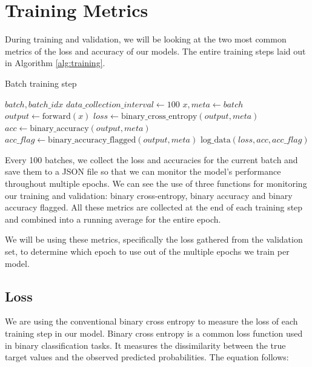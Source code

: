 \section{Training Metrics}

During training and validation, we will be looking at the two most common metrics of the loss and accuracy of our models. The entire training steps laid out in Algorithm \ref{alg:training}.

\begin{algorithm}[H]
    \caption{Batch training step}
    \begin{algorithmic}[1]
        \Require $batch, batch\_idx$
        \State $data\_collection\_interval \gets 100$
        \State $x, meta \gets batch$
        \State $output \gets \text{forward}(x)$
        \State $loss \gets \text{binary\_cross\_entropy}(output, meta)$
        \State $acc \gets \text{binary\_accuracy}(output, meta)$
        \State $acc\_flag \gets \text{binary\_accuracy\_flagged}(output, meta)$
        \State $\text{log\_data}(loss, acc, acc\_flag)$
        \EndIf
    \end{algorithmic}
    \label{alg:training}
\end{algorithm}

Every 100 batches, we collect the loss and accuracies for the current batch and save them to a JSON file so that we can monitor the model's performance throughout multiple epochs. We can see the use of three functions for monitoring our training and validation: binary cross-entropy, binary accuracy and binary accuracy flagged. All these metrics are collected at the end of each training step and combined into a running average for the entire epoch.

We will be using these metrics, specifically the loss gathered from the validation set, to determine which epoch to use out of the multiple epochs we train per model.

\subsection{Loss}

We are using the conventional binary cross entropy to measure the loss of each training step in our model. Binary cross entropy is a common loss function used in binary classification tasks. It measures the dissimilarity between the true target values and the observed predicted probabilities. The equation follows:

